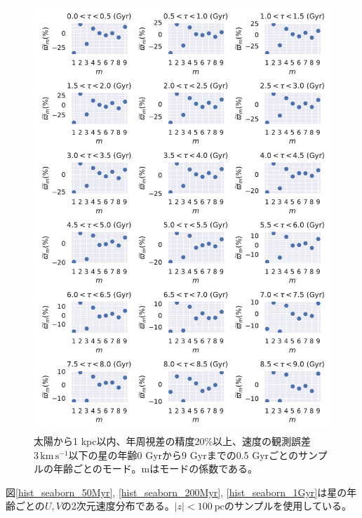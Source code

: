 \begin{figure}[htbp]
\begin{center}
	\includegraphics[width=14cm]{fig/mode_plx-age.pdf}
	\caption{太陽から1 kpc以内、年周視差の精度20\%以上、速度の観測誤差$3\,\mathrm{km\,s^{-1}}$以下の星の年齢0 Gyrから9 Gyrまでの0.5 Gyrごとのサンプルの年齢ごとのモード。mはモードの係数である。}
	\label{mode_plx-age}
\end{center}
\end{figure}

図\ref{hist_seaborn_50Myr}, \ref{hist_seaborn_200Myr}, \ref{hist_seaborn_1Gyr}は星の年齢ごとの$U,V$の2次元速度分布である。$|z|<100\ \mathrm{pc}$のサンプルを使用している。

